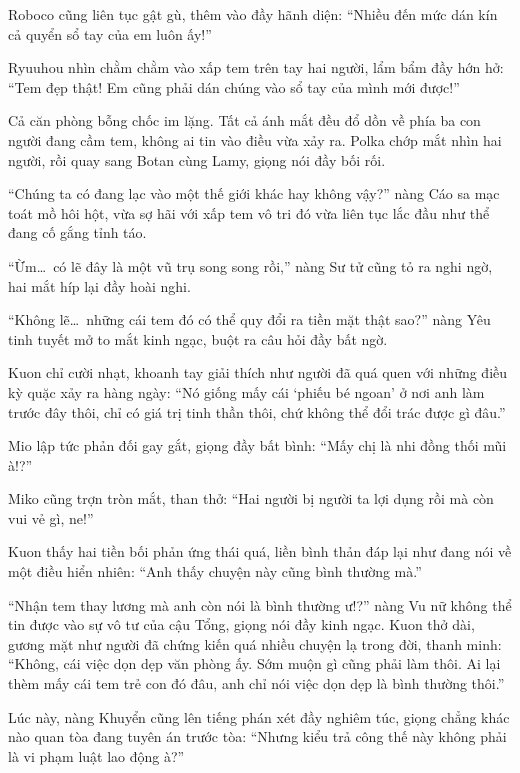 \documentclass[../main.tex]{subfiles}
\begin{document}
Roboco cũng liên tục gật gù, thêm vào đầy hãnh diện: ``Nhiều đến mức dán kín cả quyển sổ tay của em luôn ấy!''

Ryuuhou nhìn chằm chằm vào xấp tem trên tay hai người, lẩm bẩm đầy hớn hở: ``Tem đẹp thật! Em cũng phải dán chúng vào sổ tay của mình mới được!''

Cả căn phòng bỗng chốc im lặng. Tất cả ánh mắt đều đổ dồn về phía ba con người đang cầm tem, không ai tin vào điều vừa xảy ra. Polka chớp mắt nhìn hai người, rồi quay sang Botan cùng Lamy, giọng nói đầy bối rối.

``Chúng ta có đang lạc vào một thế giới khác hay không vậy?'' nàng Cáo sa mạc toát mồ hôi hột, vừa sợ hãi với xấp tem vô tri đó vừa liên tục lắc đầu như thể đang cố gắng tỉnh táo.

``Ừm\dots\ có lẽ đây là một vũ trụ song song rồi,'' nàng Sư tử cũng tỏ ra nghi ngờ, hai mắt híp lại đầy hoài nghi.

``Không lẽ\dots\ những cái tem đó có thể quy đổi ra tiền mặt thật sao?'' nàng Yêu tinh tuyết mở to mắt kinh ngạc, buột ra câu hỏi đầy bất ngờ.

Kuon chỉ cười nhạt, khoanh tay giải thích như người đã quá quen với những điều kỳ quặc xảy ra hàng ngày: ``Nó giống mấy cái `phiếu bé ngoan' ở nơi anh làm trước đây thôi, chỉ có giá trị tinh thần thôi, chứ không thể đổi trác được gì đâu.''


Mio lập tức phản đối gay gắt, giọng đầy bất bình: ``Mấy chị là nhi đồng thối mũi à!?''

Miko cũng trợn tròn mắt, than thở: ``Hai người bị người ta lợi dụng rồi mà còn vui vẻ gì, ne!''

Kuon thấy hai tiền bối phản ứng thái quá, liền bình thản đáp lại như đang nói về một điều hiển nhiên: ``Anh thấy chuyện này cũng bình thường mà.''

``Nhận tem thay lương mà anh còn nói là bình thường ư!?'' nàng Vu nữ không thể tin được vào sự vô tư của cậu Tổng, giọng nói đầy kinh ngạc. Kuon thở dài, gương mặt như người đã chứng kiến quá nhiều chuyện lạ trong đời, thanh minh: ``Không, cái việc dọn dẹp văn phòng ấy. Sớm muộn gì cũng phải làm thôi. Ai lại thèm mấy cái tem trẻ con đó đâu, anh chỉ nói việc dọn dẹp là bình thường thôi.''

Lúc này, nàng Khuyển cũng lên tiếng phán xét đầy nghiêm túc, giọng chẳng khác nào quan tòa đang tuyên án trước tòa: ``Nhưng kiểu trả công thế này không phải là vi phạm luật lao động à?''
\end{document}
